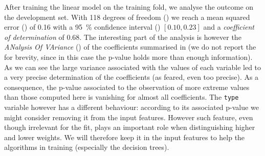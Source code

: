 After training the linear model on the training fold, we analyse the outcome on the development set.
With 118 degrees of freedom (\dof) we reach a mean squared error (\mse) of \num{0.16} with a \SI{95}{\percent} confidence interval (\ci) $[0.10, 0.23]$ and a \emph{coefficient of determination} \rr of \num{0.68}.\footnotemark{}
The interesting part of the analysis is however the \emph{ANalysis Of VAriance} (\anova) of the coefficients summarised in  (we do not report the \ci for brevity, since in this case the p-value holds more than enough information).
As we can see the large variance associated with the values of each variable led to a very precise determination of the coefficients (as feared, even too precise).
As a consequence, the p-value associated to the observation of more extreme values than those computed here is vanishing for almost all coefficients.
The \texttt{type} variable however has a different behaviour: according to its associated p-value we might consider removing it from the input features.
However such feature, even though irrelevant for the fit, plays an important role when distinguishing higher and lower weights.
We will therefore keep it in the input features to help the algorithms in training (especially the decision trees).\footnotemark{}

